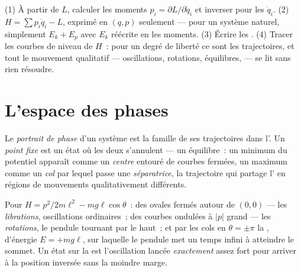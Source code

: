 \begin{method}\label{met:b3:hamiltonian-mechanics:recipe}
(1) À partir de $L$, calculer les moments $p_i = \partial L/\partial\dot q_i$
et inverser pour les $\dot q_i$. (2) $H = \sum p_i\dot q_i - L$,
exprimé en $(q, p)$ seulement --- pour un système naturel, simplement
$E_k + E_p$ avec $E_k$ réécrite en les moments. (3) Écrire les
. (4) Tracer les courbes de niveau de $H$~: pour un
degré de liberté ce sont les trajectoires, et tout le mouvement
qualitatif --- oscillations, rotations, équilibres,  --- se
lit sans rien résoudre.
\end{method}

\section{L'espace des phases}

\begin{definition}\label{def:b3:hamiltonian-mechanics:portrait}
Le \emph{portrait de phase} d'un système est la famille de ses
trajectoires dans l'. Un \emph{point fixe} est un état
où les deux  s'annulent --- un équilibre~: un
minimum du potentiel apparaît comme un \emph{centre} entouré de courbes
fermées, un maximum comme un \emph{col} par lequel passe une
\emph{séparatrice}, la trajectoire qui partage l' en
régions de mouvements qualitativement différents.
\end{definition}

\begin{example}\label{ex:b3:hamiltonian-mechanics:pendulum-portrait}
Pour $H = p^2/2m\ell^2 - mg\ell\cos\theta$~: des ovales fermés autour de
$(0, 0)$ --- les \emph{librations}, oscillations ordinaires~; des
courbes ondulées à $|p|$ grand --- les \emph{rotations}, le pendule
tournant par le haut~; et par les cols en $\theta = \pm\pi$ la
, d'énergie $E = +mg\ell$, sur laquelle le pendule met un
temps infini à atteindre le sommet. Un état sur la  est
l'oscillation lancée \emph{exactement} assez fort pour arriver à la
position inversée sans la moindre marge.
\end{example}

